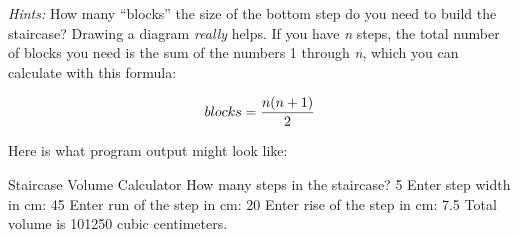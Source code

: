 \begin{exercise}
{\em Hints:} How many ``blocks'' the size of the bottom step do you need to build the staircase? Drawing a diagram {\em really} helps. If you have {\em n} steps, the total number of blocks you need is the sum of the numbers 1 through {\em n}, which you can calculate with this formula: 

\begin{equation*}
blocks = {{n(n+1)}\over 2}
\end{equation*}

Here is what program output might look like:

\begin{stdout}
Staircase Volume Calculator
How many steps in the staircase? 5
Enter step width in cm: 45
Enter run of the step in cm: 20
Enter rise of the step in cm: 7.5
Total volume is 101250 cubic centimeters.
\end{stdout}
\end{exercise}


